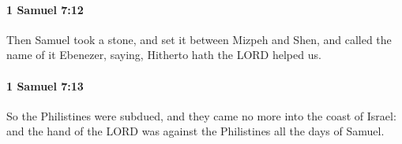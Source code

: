 		\paragraph{1 Samuel 7:12} %
			\label{1SAMUEL-7-12}

			Then Samuel took a stone, and set it between Mizpeh and Shen, and called the name of it Ebenezer, saying, Hitherto hath the LORD helped us.


		\paragraph{1 Samuel 7:13} %
			\label{1SAMUEL-7-13}

			So the Philistines were subdued, and they came no more into the coast of Israel: and the hand of the LORD was against the Philistines all the days of Samuel.



